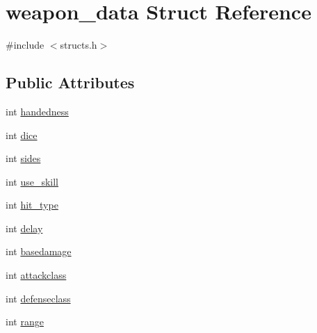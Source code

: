 \hypertarget{structweapon__data}{\section{weapon\-\_\-data Struct Reference}
\label{structweapon__data}
}


{\ttfamily \#include $<$structs.\-h$>$}

\subsection*{Public Attributes}
\begin{DoxyCompactItemize}
\item 
int \hyperlink{structweapon__data_a97586bb9d2c71f5866d21367599806bb}{handedness}
\item 
int \hyperlink{structweapon__data_a9aff2202aa2b4c62d81ca16eb2d7d1a6}{dice}
\item 
int \hyperlink{structweapon__data_acd4e98c25e656b4fdefafdc6cf3a0d07}{sides}
\item 
int \hyperlink{structweapon__data_a019395a4df1780650c9e614853b54019}{use\-\_\-skill}
\item 
int \hyperlink{structweapon__data_a7d6c5a161054ce406cfdee0dafbd4ed2}{hit\-\_\-type}
\item 
int \hyperlink{structweapon__data_ab646699ef54c800842741b89f72b6280}{delay}
\item 
int \hyperlink{structweapon__data_a333138cf76af6771957bfff26075f126}{basedamage}
\item 
int \hyperlink{structweapon__data_acdadb390593000d5561a33bd839125ef}{attackclass}
\item 
int \hyperlink{structweapon__data_aea968a5cc4ec4dc3d554ef789e58da69}{defenseclass}
\item 
int \hyperlink{structweapon__data_a4d697901007c5cd0f604b59a5864809d}{range}
\end{DoxyCompactItemize}


